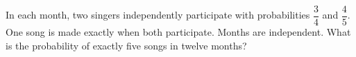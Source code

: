 In each month, two singers independently participate with probabilities $\dfrac{3}{4}$ and $\dfrac{4}{5}$. One song is made exactly when both participate. Months are independent. What is the probability of exactly five songs in twelve months?
